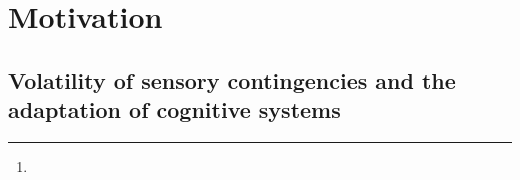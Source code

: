 \documentclass[12pt,english]{article}%
\title{\Title}%
\author{\AuthorA,
\AuthorB,
\AuthorC\thanks{\Address} }
\newcommand{\LP}[1]{\textbf{\textcolor{red}{[LP: #1]}}}
\newcommand{\AM}[1]{\textbf{\textcolor{blue}{[AM: #1]}}}
\begin{document}
%
\maketitle%
\begin{abstract}
\Abstract
\end{abstract}
\section{Motivation}
\label{sec:intro}
\subsection{Volatility of sensory contingencies and
the adaptation of cognitive systems}
\end{document}
